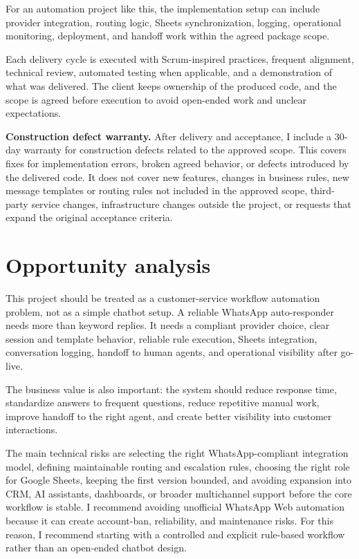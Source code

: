 \documentclass[11pt,a4paper]{article}
\begin{document}
For an automation project like this, the implementation setup can include provider integration, routing logic, Sheets synchronization, logging, operational monitoring, deployment, and handoff work within the agreed package scope.\par

Each delivery cycle is executed with Scrum-inspired practices, frequent alignment, technical review, automated testing when applicable, and a demonstration of what was delivered. The client keeps ownership of the produced code, and the scope is agreed before execution to avoid open-ended work and unclear expectations.\par

\textbf{Construction defect warranty.} After delivery and acceptance, I include a 30-day warranty for construction defects related to the approved scope. This covers fixes for implementation errors, broken agreed behavior, or defects introduced by the delivered code. It does not cover new features, changes in business rules, new message templates or routing rules not included in the approved scope, third-party service changes, infrastructure changes outside the project, or requests that expand the original acceptance criteria.\par

\section*{Opportunity analysis}

This project should be treated as a customer-service workflow automation problem, not as a simple chatbot setup. A reliable WhatsApp auto-responder needs more than keyword replies. It needs a compliant provider choice, clear session and template behavior, reliable rule execution, Sheets integration, conversation logging, handoff to human agents, and operational visibility after go-live.\par

The business value is also important: the system should reduce response time, standardize answers to frequent questions, reduce repetitive manual work, improve handoff to the right agent, and create better visibility into customer interactions.\par

The main technical risks are selecting the right WhatsApp-compliant integration model, defining maintainable routing and escalation rules, choosing the right role for Google Sheets, keeping the first version bounded, and avoiding expansion into CRM, AI assistants, dashboards, or broader multichannel support before the core workflow is stable. I recommend avoiding unofficial WhatsApp Web automation because it can create account-ban, reliability, and maintenance risks. For this reason, I recommend starting with a controlled and explicit rule-based workflow rather than an open-ended chatbot design.\par
\end{document}
